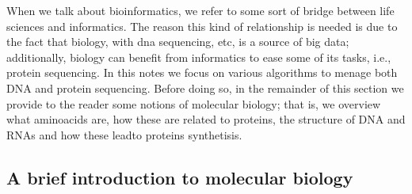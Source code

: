 \documentclass{subfiles}
\begin{document}
    When we talk about bioinformatics, we refer to some sort of bridge between 
        life sciences and informatics. The reason this kind of relationship is needed 
        is due to the fact that biology, with \gls{dna} sequencing, etc, is a source of big data;
        additionally, biology can benefit from informatics to ease some of its tasks, i.e.,
        protein sequencing. In this notes we focus on various algorithms to menage both DNA 
        and protein sequencing. Before doing so, in the remainder of this section we provide to
        the reader some notions of molecular biology; that is, we overview what aminoacids are,
        how these are related to proteins, the structure of DNA and RNAs and how these leadto proteins synthetisis.

        \subsection{A brief introduction to molecular biology}
        
        \cleardoublepage
\end{document}
